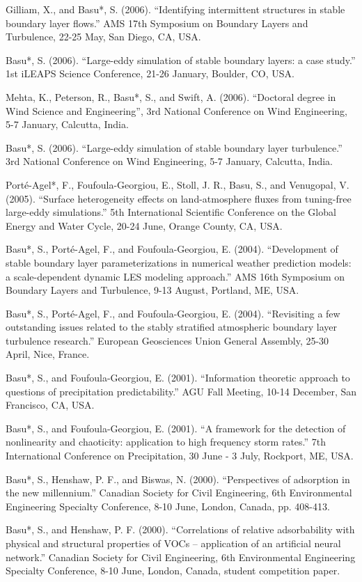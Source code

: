 \begin{etaremune}[topsep=0pt,itemsep=0pt,partopsep=0pt,parsep=0pt]
\item Gilliam, X., and Basu*, S. (2006). ``Identifying intermittent structures in stable boundary layer flows.'' AMS 17th Symposium on Boundary Layers and Turbulence, 22-25 May, San Diego, CA, USA.
\item Basu*, S. (2006). ``Large-eddy simulation of stable boundary layers: a case study.'' 1st iLEAPS Science Conference, 21-26 January, Boulder, CO, USA.
\item Mehta, K., Peterson, R., Basu*, S., and Swift, A. (2006). ``Doctoral degree in Wind Science and Engineering'', 3rd National Conference on Wind Engineering, 5-7 January, Calcutta, India.
\item Basu*, S. (2006). ``Large-eddy simulation of stable boundary layer turbulence.'' 3rd National Conference on Wind Engineering, 5-7 January, Calcutta, India. 
\item Porté-Agel*, F., Foufoula-Georgiou, E., Stoll, J. R., Basu, S., and Venugopal, V. (2005). ``Surface heterogeneity effects on land-atmosphere fluxes from tuning-free large-eddy simulations.'' 5th International Scientific Conference on the Global Energy and Water Cycle, 20-24 June, Orange County, CA, USA.
\item Basu*, S., Porté-Agel, F., and Foufoula-Georgiou, E. (2004). ``Development of stable boundary layer parameterizations in numerical weather prediction models: a scale-dependent dynamic LES modeling approach.'' AMS 16th Symposium on Boundary Layers and Turbulence, 9-13 August, Portland, ME, USA.
\item Basu*, S., Porté-Agel, F., and Foufoula-Georgiou, E. (2004). ``Revisiting a few outstanding issues related to the stably stratified atmospheric boundary layer turbulence research.'' European Geosciences Union General Assembly, 25-30 April, Nice, France.
\item Basu*, S., and Foufoula-Georgiou, E. (2001). ``Information theoretic approach to questions of precipitation predictability.'' AGU Fall Meeting, 10-14 December, San Francisco, CA, USA.
\item Basu*, S., and Foufoula-Georgiou, E. (2001). ``A framework for the detection of nonlinearity and chaoticity: application to high frequency storm rates.'' 7th International Conference on Precipitation, 30 June - 3 July, Rockport, ME, USA. 
\item Basu*, S., Henshaw, P. F., and Biswas, N. (2000). ``Perspectives of adsorption in the new millennium.'' Canadian Society for Civil Engineering, 6th Environmental Engineering Specialty Conference, 8-10 June, London, Canada, pp. 408-413. 
\item Basu*, S., and Henshaw, P. F. (2000). ``Correlations of relative adsorbability with physical and structural properties of VOCs -- application of an artificial neural network.'' Canadian Society for Civil Engineering, 6th Environmental Engineering Specialty Conference, 8-10 June, London, Canada, student competition paper. 
\end{etaremune}

